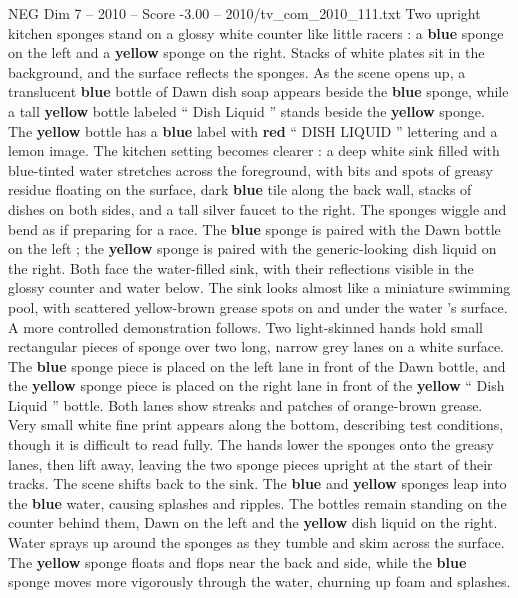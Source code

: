 \begin{textsample}{NEG Dim 7 – 2010 – Score -3.00 – 2010/tv\_com\_2010\_111.txt}  \label{ex:f7_neg_048}
Two upright kitchen sponges stand on a glossy white counter like little racers : a \textbf{blue} sponge on the left and a \textbf{yellow} sponge on the right.
Stacks of white plates sit in the background, and the surface reflects the sponges.
As the scene opens up, a translucent \textbf{blue} bottle of Dawn dish soap appears beside the \textbf{blue} sponge, while a tall \textbf{yellow} bottle labeled “ Dish Liquid ” stands beside the \textbf{yellow} sponge.
The \textbf{yellow} bottle has a \textbf{blue} label with \textbf{red} “ DISH LIQUID ” lettering and a lemon image.
The kitchen setting becomes clearer : a deep white sink filled with blue-tinted water stretches across the foreground, with bits and spots of greasy residue floating on the surface, dark \textbf{blue} tile along the back wall, stacks of dishes on both sides, and a tall silver faucet to the right.
The sponges wiggle and bend as if preparing for a race.
The \textbf{blue} sponge is paired with the Dawn bottle on the left ; the \textbf{yellow} sponge is paired with the generic-looking dish liquid on the right.
Both face the water-filled sink, with their reflections visible in the glossy counter and water below.
The sink looks almost like a miniature swimming pool, with scattered yellow-brown grease spots on and under the water ’s surface.
A more controlled demonstration follows.
Two light-skinned hands hold small rectangular pieces of sponge over two long, narrow grey lanes on a white surface.
The \textbf{blue} sponge piece is placed on the left lane in front of the Dawn bottle, and the \textbf{yellow} sponge piece is placed on the right lane in front of the \textbf{yellow} “ Dish Liquid ” bottle.
Both lanes show streaks and patches of orange-brown grease.
Very small white fine print appears along the bottom, describing test conditions, though it is difficult to read fully.
The hands lower the sponges onto the greasy lanes, then lift away, leaving the two sponge pieces upright at the start of their tracks.
The scene shifts back to the sink.
The \textbf{blue} and \textbf{yellow} sponges leap into the \textbf{blue} water, causing splashes and ripples.
The bottles remain standing on the counter behind them, Dawn on the left and the \textbf{yellow} dish liquid on the right.
Water sprays up around the sponges as they tumble and skim across the surface.
The \textbf{yellow} sponge floats and flops near the back and side, while the \textbf{blue} sponge moves more vigorously through the water, churning up foam and splashes.

\end{textsample}
